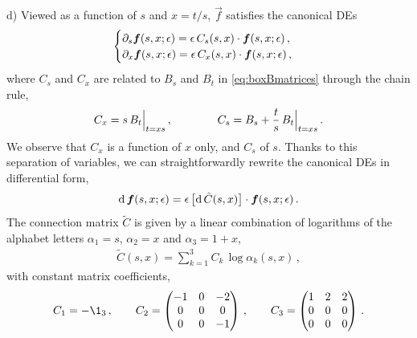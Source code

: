 \smallskip
\noindent
d) Viewed as a function of $s$ and $x=t/s$, $\vec{f}$ satisfies the canonical DEs
\begin{align}
\begin{cases}
\partial_s \vec{f}(s,x;\eps)  = \eps \, C_s(s,x)  \cdot   \vec{f}(s,x;\eps) \,, \\
\partial_x \vec{f}(s,x;\eps)  = \eps \, C_x(s,x)  \cdot   \vec{f}(s,x;\eps) \,, \\
\end{cases}
\end{align}
where $C_s$ and $C_x$ are related to $B_s$ and $B_t$ in \eqref{eq:boxBmatrices} through the chain rule,
\begin{align}
C_x  = s \, B_t \Bigl|_{t=x s} \,, \qquad \qquad C_s = B_s + \frac{t}{s} \, B_t \Bigl|_{t=x s} \,.
\end{align}
We observe that $C_x$  is a function of $x$ only, and $C_s$ of $s$. Thanks to this separation of variables, we can straightforwardly rewrite the canonical DEs in differential form,
\begin{align} \label{eq:box_canDEs_dlog}
\d \, \vec{f}(s,x;\eps) = \eps \, \bigl[ \d \, \tilde{C}(s,x) \bigr] \cdot \vec{f}(s,x;\eps) \,.
\end{align}
The connection matrix $\tilde{C}$ is given by a linear combination of logarithms of the alphabet letters $\alpha_1 = s$, $\alpha_2 = x$ and $\alpha_3 = 1+x$, 
\begin{align}
\tilde{C}(s,x) = \sum_{k=1}^3 C_k \, \log \alpha_k(s,x) \,,
\end{align}
with constant matrix coefficients,
\begin{align}
C_1 = - \1_{3} \,, \qquad 
C_2 = \begin{pmatrix}
  -1 & 0 & -2 \\
  0 & 0 & 0 \\
  0 & 0 & -1 \\
\end{pmatrix} \,, \qquad
C_3 = \begin{pmatrix}
  1 & 2 & 2 \\
  0 & 0 & 0 \\
  0 & 0 & 0 \\
\end{pmatrix}\,.
\end{align}


